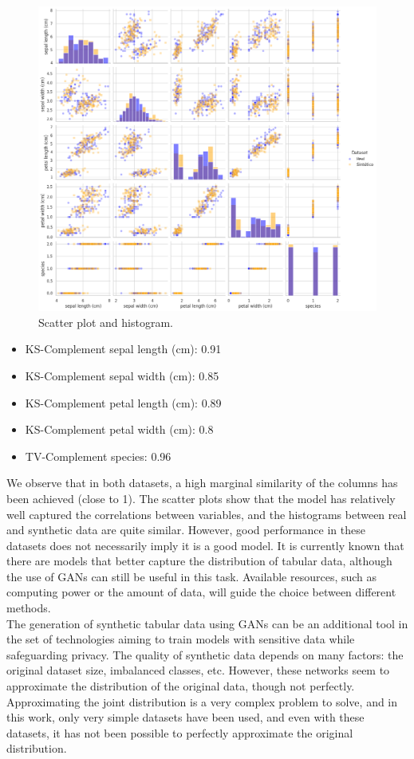 \begin{figure}[H]
    \centering
    \includegraphics*[scale=.3]{figures/4-Advanced_Strategies/pairplot-Dataset2.png}
    \caption{Scatter plot and histogram.}
\end{figure}

\begin{itemize}
    \item KS-Complement sepal length (cm): 0.91
    \item KS-Complement sepal width (cm): 0.85
    \item KS-Complement petal length (cm): 0.89
    \item KS-Complement petal width (cm): 0.8
    \item TV-Complement species: 0.96
\end{itemize}

We observe that in both datasets, a high marginal similarity of the columns has been achieved (close to 1). The scatter plots show that the model has relatively well captured the correlations between variables, and the histograms between real and synthetic data are quite similar. However, good performance in these datasets does not necessarily imply it is a good model. It is currently known that there are models that better capture the distribution of tabular data, although the use of GANs can still be useful in this task. Available resources, such as computing power or the amount of data, will guide the choice between different methods.\\
The generation of synthetic tabular data using GANs can be an additional tool in the set of technologies aiming to train models with sensitive data while safeguarding privacy. The quality of synthetic data depends on many factors: the original dataset size, imbalanced classes, etc. However, these networks seem to approximate the distribution of the original data, though not perfectly. Approximating the joint distribution is a very complex problem to solve, and in this work, only very simple datasets have been used, and even with these datasets, it has not been possible to perfectly approximate the original distribution.

